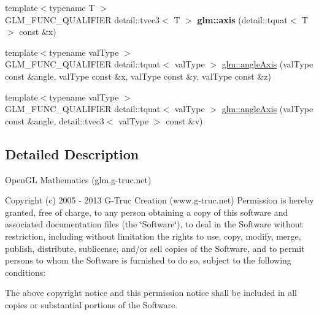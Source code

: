\begin{DoxyCompactItemize}
\item 
\hypertarget{namespaceglm_a4103176273d812154bd34d4f697d612d}{}{\footnotesize template$<$typename T $>$ }\\G\+L\+M\+\_\+\+F\+U\+N\+C\+\_\+\+Q\+U\+A\+L\+I\+F\+I\+E\+R detail\+::tvec3$<$ T $>$ {\bfseries glm\+::axis} (detail\+::tquat$<$ T $>$ const \&x)\label{namespaceglm_a4103176273d812154bd34d4f697d612d}

\item 
{\footnotesize template$<$typename val\+Type $>$ }\\G\+L\+M\+\_\+\+F\+U\+N\+C\+\_\+\+Q\+U\+A\+L\+I\+F\+I\+E\+R detail\+::tquat$<$ val\+Type $>$ \hyperlink{group__gtc__quaternion_gaafc03953867e42a39dc08575ad4532ad}{glm\+::angle\+Axis} (val\+Type const \&angle, val\+Type const \&x, val\+Type const \&y, val\+Type const \&z)
\item 
{\footnotesize template$<$typename val\+Type $>$ }\\G\+L\+M\+\_\+\+F\+U\+N\+C\+\_\+\+Q\+U\+A\+L\+I\+F\+I\+E\+R detail\+::tquat$<$ val\+Type $>$ \hyperlink{group__gtc__quaternion_ga30071b5b9773087b7212a5ce67d0d90a}{glm\+::angle\+Axis} (val\+Type const \&angle, detail\+::tvec3$<$ val\+Type $>$ const \&v)
\end{DoxyCompactItemize}


\subsection{Detailed Description}
Open\+G\+L Mathematics (glm.\+g-\/truc.\+net)

Copyright (c) 2005 -\/ 2013 G-\/\+Truc Creation (www.\+g-\/truc.\+net) Permission is hereby granted, free of charge, to any person obtaining a copy of this software and associated documentation files (the \char`\"{}\+Software\char`\"{}), to deal in the Software without restriction, including without limitation the rights to use, copy, modify, merge, publish, distribute, sublicense, and/or sell copies of the Software, and to permit persons to whom the Software is furnished to do so, subject to the following conditions\+:

The above copyright notice and this permission notice shall be included in all copies or substantial portions of the Software.

